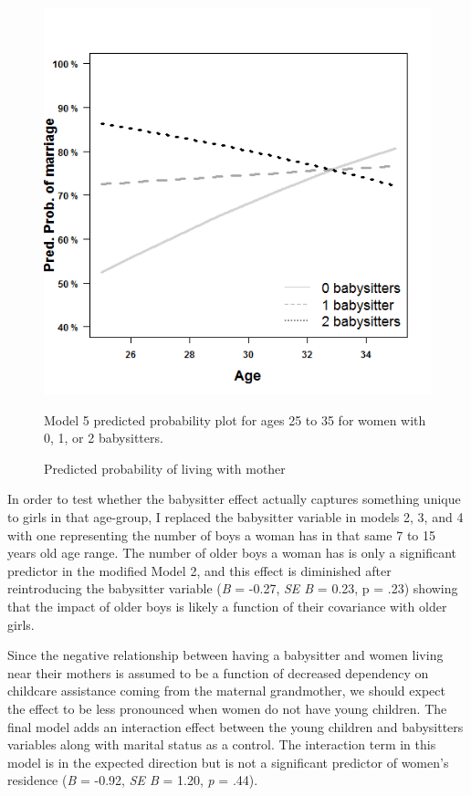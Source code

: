 \documentclass[10pt]{article}
\begin{document}
\begin{figure}[!tb]
    \centering
    \includegraphics[scale=.55]{images/mar_bbsit}
\caption{Predicted probability of living with mother \label{fig:mar_bbsit} }
\medskip
Model 5 predicted probability plot for ages 25 to 35 for women with 0, 1, or 2 babysitters.
\end{figure}

In order to test whether the babysitter effect actually captures something unique to girls in that age-group, I replaced the babysitter variable in models 2, 3, and 4 with one representing the number of boys a woman has in that same 7 to 15 years old age range.  The number of older boys a woman has is only a significant predictor in the modified Model 2, and this effect is diminished after reintroducing the babysitter variable (\emph{B} = -0.27, \emph{SE B} = 0.23, p = .23) showing that the impact of older boys is likely a function of their covariance with older girls. 

Since the negative relationship between having a babysitter and women living near their mothers is assumed to be a function of decreased dependency on childcare assistance coming from the maternal grandmother, we should expect the effect to be less pronounced when women do not have young children.  The final model adds an interaction effect between the young children and babysitters variables along with marital status as a control.  The interaction term in this model is in the expected direction but is not a significant predictor of women's residence (\emph{B} = -0.92, \emph{SE B} = 1.20, \emph{p} = .44).               
\end{document}
